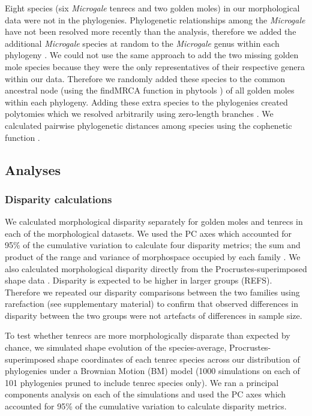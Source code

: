 \documentclass[12pt,a4paper]{article}
\begin{document}
Eight species (six \textit{Microgale} tenrecs and two golden moles) in our morphological data were not in the phylogenies. Phylogenetic relationships among the \textit{Microgale} have not been resolved more recently than the \citep{Kuhn2011} analysis, therefore we added the additional \textit{Microgale} species at random to the \textit{Microgale} genus within each phylogeny \citep{Revell2012}. We could not use the same approach to add the two missing golden mole species because they were the only representatives of their respective genera within our data. Therefore we randomly added these species to the common ancestral node (using the findMRCA function in phytools \citep{Revell2012}) of all golden moles within each phylogeny. Adding these extra species to the phylogenies created polytomies which we resolved arbitrarily using zero-length branches \citep{Paradis2004}. We calculated pairwise phylogenetic distances among species using the cophenetic function \citep[R Development Core][]{Team2013}. 
	
\subsection{Analyses}
\subsubsection{Disparity calculations} 

We calculated morphological disparity separately for golden moles and tenrecs in each of the morphological datasets. We used the PC axes which accounted for 95\% of the cumulative variation to calculate four disparity metrics; the sum and product of the range and variance of morphospace occupied by each family \citep{Brusatte2008, Foth2012, Ruta2013}. We also calculated morphological disparity directly from the Procrustes-superimposed shape data \citep{Zelditch2012}. 
Disparity is expected to be higher in larger groups (REFS). Therefore we repeated our disparity comparisons between the two families using rarefaction (see supplementary material) to confirm that observed differences in disparity between the two groups were not artefacts of differences in sample size.

To test whether tenrecs are more morphologically disparate than expected by chance, we simulated shape evolution  \citep{Harmon2008} of the species-average, Procrustes-superimposed shape coordinates of each tenrec species across our distribution of phylogenies under a Brownian Motion (BM) model (1000 simulations on each of 101 phylogenies pruned to include tenrec species only). We ran a principal components analysis on each of the simulations and used the PC axes which accounted for 95\% of the cumulative variation to calculate disparity metrics.
\end{document}
